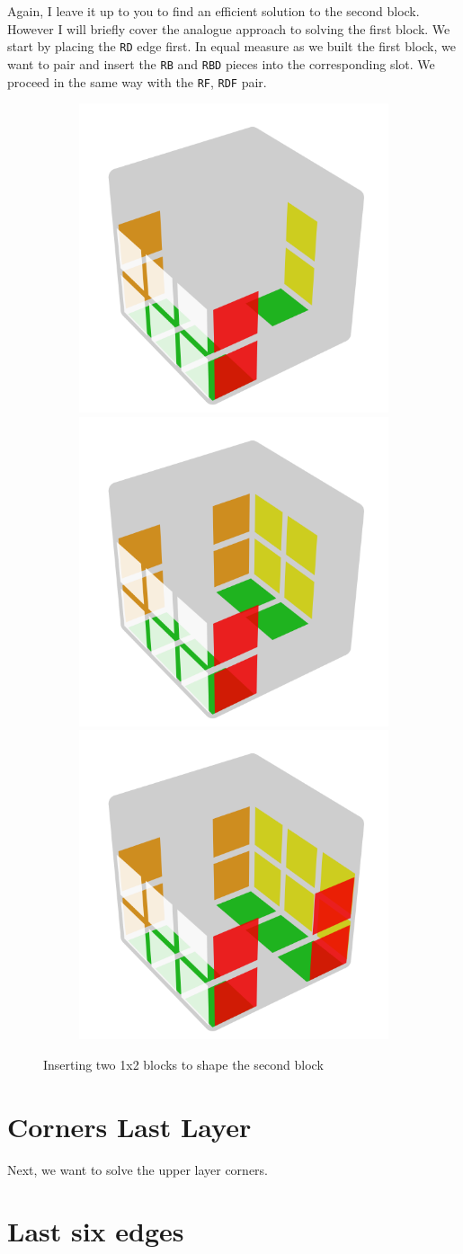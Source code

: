 \documentclass[a4paper]{scrreprt}
\begin{document}
Again, I leave it up to you to find an efficient solution to the second block. However I will briefly cover the analogue approach to solving the first block. We start by placing the \texttt{RD} edge first. In equal measure as we built the first block, we want to pair and insert the \texttt{RB} and \texttt{RBD} pieces into the corresponding slot. We proceed in the same way with the \texttt{RF}, \texttt{RDF} pair.

\begin{figure}[h]
\centering
\begin{subfigure}{.9\textwidth}
   \includegraphics[width=.3\linewidth]{resources/sb_1.png}
   \includegraphics[width=.3\linewidth]{resources/sb_2.png}
   \includegraphics[width=.3\linewidth]{resources/sb_3.png}
\end{subfigure}
\caption*{Inserting two 1x2 blocks to shape the second block}
\end{figure}

\section{Corners Last Layer}
Next, we want to solve the upper layer corners. 


\section{Last six edges}
\end{document}
